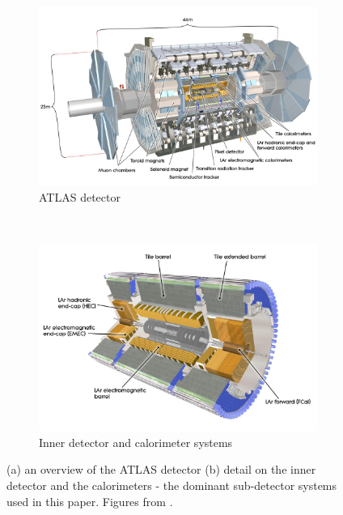 \documentclass[a4paper,11pt]{report}
\begin{document}
\begin{figure}[t]
  \centering
  \begin{subfigure}[b]{0.9\textwidth}
    \includegraphics[width=\textwidth]{Chapter2/ATLAS.png}
    \caption{ATLAS detector}
    \label{fig:ATLASfull}
  \end{subfigure}
  ~
  \begin{subfigure}[b]{0.9\textwidth}
    \includegraphics[width=\textwidth]{Chapter2/ATLASinner.jpeg}
    \caption{Inner detector and calorimeter systems}
    \label{fig:ATLASinner}
  \end{subfigure}
  \caption{(a) an overview of the ATLAS detector 
           (b) detail on the inner detector and the calorimeters - the dominant
           sub-detector systems used in this paper. Figures from
           \cite{CERNbook}.}
  \label{fig:ATLAS}
\end{figure}
\end{document}
